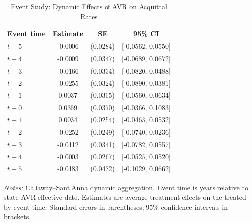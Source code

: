 \begin{table}[htbp]
\centering
\caption{Event Study: Dynamic Effects of AVR on Acquittal Rates}
\label{tab:event_study}
\begin{tabular}{lccc}
\hline\hline
Event time & Estimate & SE & 95\% CI \\
\hline
$t-5$ & -0.0006 & (0.0284) & [-0.0562, 0.0550] \\
$t-4$ & -0.0009 & (0.0347) & [-0.0689, 0.0672] \\
$t-3$ & -0.0166 & (0.0334) & [-0.0820, 0.0488] \\
$t-2$ & -0.0255 & (0.0324) & [-0.0890, 0.0381] \\
$t-1$ & 0.0037 & (0.0305) & [-0.0560, 0.0634] \\
$t+0$ & 0.0359 & (0.0370) & [-0.0366, 0.1083] \\
$t+1$ & 0.0034 & (0.0254) & [-0.0463, 0.0532] \\
$t+2$ & -0.0252 & (0.0249) & [-0.0740, 0.0236] \\
$t+3$ & -0.0112 & (0.0341) & [-0.0782, 0.0557] \\
$t+4$ & -0.0003 & (0.0267) & [-0.0525, 0.0520] \\
$t+5$ & -0.0183 & (0.0432) & [-0.1029, 0.0662] \\
\hline\hline
\end{tabular}
\begin{tablenotes}
\item \textit{Notes:} Callaway--Sant'Anna dynamic aggregation. Event time is years relative to state AVR effective date. Estimates are average treatment effects on the treated by event time. Standard errors in parentheses; 95\% confidence intervals in brackets.
\end{tablenotes}
\end{table}

